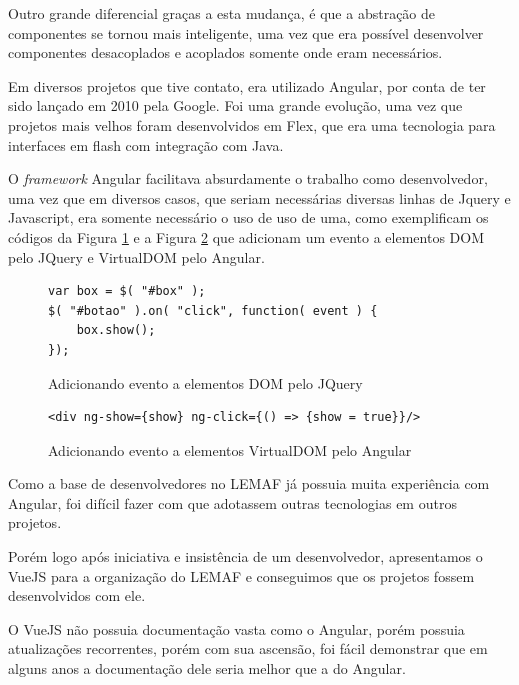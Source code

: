 Outro grande diferencial graças a esta mudança, é que a abstração de componentes se tornou mais inteligente, uma vez que era possível desenvolver componentes desacoplados e acoplados somente onde eram necessários.

Em diversos projetos que tive contato, era utilizado Angular, por conta de ter sido lançado em 2010 pela Google. Foi uma grande evolução, uma vez que projetos mais velhos foram desenvolvidos em Flex, que era uma tecnologia para interfaces em flash com integração com Java.

O \textit{framework} Angular facilitava absurdamente o trabalho como desenvolvedor, uma vez que em diversos casos, que seriam necessárias diversas linhas de Jquery e Javascript, era somente necessário o uso de uso de uma, como exemplificam os códigos da Figura \ref{fig:exemplocodigo1} e a Figura \ref{fig:exemplocodigo2} que adicionam um evento a elementos DOM pelo JQuery e VirtualDOM pelo Angular.


\begin{figure}[!htb]
\centering
\caption{Adicionando evento a elementos DOM pelo JQuery} %
\begin{lstlisting}
var box = $( "#box" );
$( "#botao" ).on( "click", function( event ) {
    box.show();
});
\end{lstlisting} 
\label{fig:exemplocodigo1} %
\end{figure}

\begin{figure}[!htb]
\centering
\caption{Adicionando evento a elementos VirtualDOM pelo Angular} %
\begin{lstlisting}
<div ng-show={show} ng-click={() => {show = true}}/>
\end{lstlisting} 
\label{fig:exemplocodigo2} %
\end{figure}
    

Como a base de desenvolvedores no LEMAF já possuia muita experiência com Angular, foi difícil fazer com que adotassem outras tecnologias em outros projetos.

Porém logo após iniciativa e insistência de um desenvolvedor, apresentamos o VueJS para a organização do LEMAF e conseguimos que os projetos fossem desenvolvidos com ele.

O VueJS não possuia documentação vasta como o Angular, porém possuia atualizações recorrentes, porém com sua ascensão, foi fácil demonstrar que em alguns anos a documentação dele seria melhor que a do Angular.

